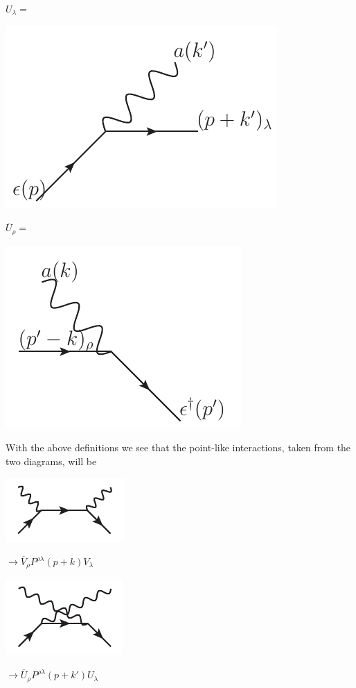 $U_\lambda = $
\begin{minipage}{1in}
   \includegraphics[scale=0.7]{eps/U-lambda} 
\end{minipage}
\hspace{8em}
$\overline{U}_\rho = $
\begin{minipage}{1in}
   \includegraphics[scale=0.7]{eps/U-bar-rho} 
\end{minipage}

With the above definitions we see that the point-like interactions, taken from the two diagrams, will be

\begin{minipage}{1in}
   \includegraphics[scale=1]{eps/uncrossed-small} 
\end{minipage}
$ \to \overline{V}_\rho P^{\rho \lambda}(p+k) V_\lambda$
\hspace{5em}
\begin{minipage}{1in}
   \includegraphics[scale=1]{eps/crossed-small} 
\end{minipage}
$ \to \overline{U}_\rho P^{\rho \lambda}(p+k') U_\lambda$




